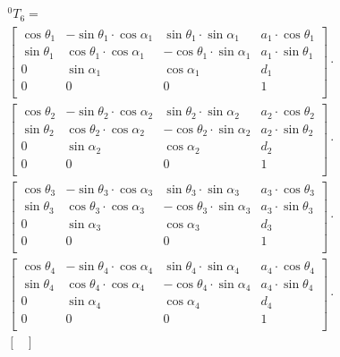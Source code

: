 \begin{multline}\label{eq:TransformMatrices_0-6}
	^0T_6=\\
	\begin{bmatrix}
\cos\theta_1 & -\sin\theta_1 \cdot \cos\alpha_1 & \sin\theta_1 \cdot \sin\alpha_1 & a_1 \cdot \cos\theta_1 \\
\sin\theta_1 & \cos\theta_1 \cdot \cos\alpha_1 & -\cos\theta_1 \cdot \sin\alpha_1 & a_1 \cdot \sin\theta_1 \\
0 & \sin\alpha_1 & \cos\alpha_1 & d_1 \\
0 & 0 & 0 & 1 \\
\end{bmatrix}
 \cdot \\
\begin{bmatrix}
\cos\theta_2 & -\sin\theta_2 \cdot \cos\alpha_2 & \sin\theta_2 \cdot \sin\alpha_2 & a_2 \cdot \cos\theta_2 \\
\sin\theta_2 & \cos\theta_2 \cdot \cos\alpha_2 & -\cos\theta_2 \cdot \sin\alpha_2 & a_2 \cdot \sin\theta_2 \\
0 & \sin\alpha_2 & \cos\alpha_2 & d_2 \\
0 & 0 & 0 & 1 \\
\end{bmatrix}
 \cdot \\
\begin{bmatrix}
\cos\theta_3 & -\sin\theta_3 \cdot \cos\alpha_3 & \sin\theta_3 \cdot \sin\alpha_3 & a_3 \cdot \cos\theta_3 \\
\sin\theta_3 & \cos\theta_3 \cdot \cos\alpha_3 & -\cos\theta_3 \cdot \sin\alpha_3 & a_3 \cdot \sin\theta_3 \\
0 & \sin\alpha_3 & \cos\alpha_3 & d_3 \\
0 & 0 & 0 & 1 \\
\end{bmatrix}
 \cdot \\
\begin{bmatrix}
\cos\theta_4 & -\sin\theta_4 \cdot \cos\alpha_4 & \sin\theta_4 \cdot \sin\alpha_4 & a_4 \cdot \cos\theta_4 \\
\sin\theta_4 & \cos\theta_4 \cdot \cos\alpha_4 & -\cos\theta_4 \cdot \sin\alpha_4 & a_4 \cdot \sin\theta_4 \\
0 & \sin\alpha_4 & \cos\alpha_4 & d_4 \\
0 & 0 & 0 & 1 \\
\end{bmatrix}
 \cdot \\
\begin{bmatrix}

\end{bmatrix}
\end{multline}

